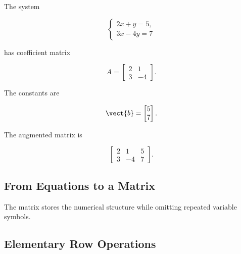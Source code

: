 The system

\[ \begin{cases} 2x+y=5,\\ 3x-4y=7 \end{cases} \]

has coefficient matrix

\[ A=\begin{bmatrix}2&1\\3&-4\end{bmatrix}. \]

The constants are

\[ \vect{b}=\begin{bmatrix}5\\7\end{bmatrix}. \]

The augmented matrix is

\[ \left[\begin{array}{cc|c}2&1&5\\3&-4&7\end{array}\right]. \]

\subsection{From Equations to a Matrix}
\label{subsec:equations-to-matrix-visual}

\begin{center}
\end{center}

The matrix stores the numerical structure while omitting repeated variable
symbols.

\subsection{Elementary Row Operations}
\label{subsec:elementary-row-operations}

